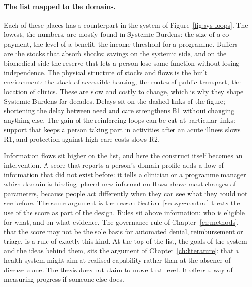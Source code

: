 \paragraph{The list mapped to the domains.} Each of these places has a
counterpart in the system of Figure~\ref{fig:sys-loops}. The lowest, the
numbers, are mostly found in Systemic Burdens: the size of a co-payment, the
level of a benefit, the income threshold for a programme. Buffers are the
stocks that absorb shocks: savings on the systemic side, and on the biomedical
side the reserve that lets a person lose some function without losing
independence. The physical structure of stocks and flows is the built
environment: the stock of accessible housing, the routes of public transport,
the location of clinics. These are slow and costly to change, which is why
they shape Systemic Burdens for decades. Delays sit on the dashed links of the
figure; shortening the delay between need and care strengthens B1 without
changing anything else. The gain of the reinforcing loops can be cut at
particular links: support that keeps a person taking part in activities after
an acute illness slows R1, and protection against high care costs slows R2.

Information flows sit higher on the list, and here the construct itself
becomes an intervention. A score that reports a person's domain profile adds
a flow of information that did not exist before: it tells a clinician or a
programme manager which domain is binding. \citet{meadows_1999} placed new
information flows above most changes of parameters, because people act
differently when they can see what they could not see before. The same
argument is the reason Section~\ref{sec:sys-control} treats the use of the
score as part of the design. Rules sit above information: who is eligible for
what, and on what evidence. The governance rule of Chapter~\ref{ch:methods},
that the score may not be the sole basis for automated denial, reimbursement
or triage, is a rule of exactly this kind. At the top of the list, the goals
of the system and the ideas behind them, sits the argument of
Chapter~\ref{ch:literature}: that a health system might aim at realised
capability rather than at the absence of disease alone. The thesis does not
claim to move that level. It offers a way of measuring progress if someone
else does.

